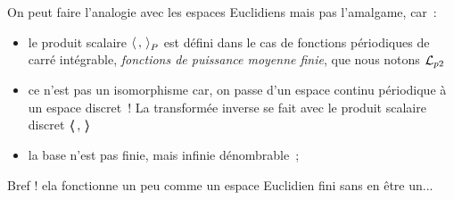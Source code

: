 
On peut faire l'analogie avec les espaces Euclidiens mais pas
l'amalgame, car~:
\begin{itemize}
\item le produit scalaire $\langle\,,\,{\rangle}_P$ est défini dans le cas de
  fonctions périodiques de carré intégrable, \emph{fonctions de
    puissance moyenne finie}, que nous notons $\mathcal{L}_{p 2}$
\item ce n'est pas un isomorphisme car, on passe d'un espace continu
  périodique à un espace discret~! La transformée inverse se fait avec
  le produit scalaire discret $\langle\!\!\langle\,,\,\rangle\!\!\rangle$
\item la base n'est pas finie, mais infinie dénombrable~;
\end{itemize}

Bref ! ela fonctionne un peu comme un espace Euclidien fini sans en
être un...

